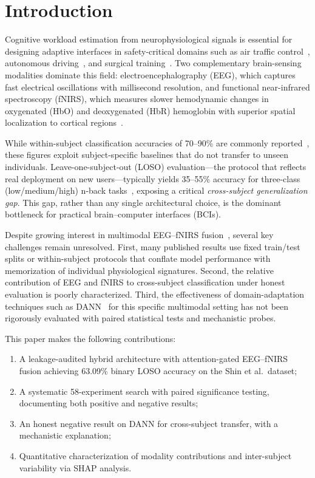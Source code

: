 \documentclass[conference]{IEEEtran}
\begin{document}
\section{Introduction}

Cognitive workload estimation from neurophysiological signals is essential for designing adaptive interfaces in safety-critical domains such as air traffic control~\cite{arico2016passive}, autonomous driving~\cite{dehais2020neuroergonomics}, and surgical training~\cite{guru2015surgical}. Two complementary brain-sensing modalities dominate this field: electroencephalography (EEG), which captures fast electrical oscillations with millisecond resolution, and functional near-infrared spectroscopy (fNIRS), which measures slower hemodynamic changes in oxygenated (HbO) and deoxygenated (HbR) hemoglobin with superior spatial localization to cortical regions~\cite{naseer2015fnirs}.

While within-subject classification accuracies of 70--90\% are commonly reported~\cite{shin2017open,aghajani2017measuring}, these figures exploit subject-specific baselines that do not transfer to unseen individuals. Leave-one-subject-out (LOSO) evaluation---the protocol that reflects real deployment on new users---typically yields 35--55\% accuracy for three-class (low/medium/high) n-back tasks~\cite{shin2018simultaneous,khan2020hybrid}, exposing a critical \emph{cross-subject generalization gap}. This gap, rather than any single architectural choice, is the dominant bottleneck for practical brain--computer interfaces (BCIs).

Despite growing interest in multimodal EEG--fNIRS fusion~\cite{hong2018hybrid,khan2014decoding,fazli2012enhanced}, several key challenges remain unresolved. First, many published results use fixed train/test splits or within-subject protocols that conflate model performance with memorization of individual physiological signatures. Second, the relative contribution of EEG and fNIRS to cross-subject classification under honest evaluation is poorly characterized. Third, the effectiveness of domain-adaptation techniques such as DANN~\cite{ganin2016domain} for this specific multimodal setting has not been rigorously evaluated with paired statistical tests and mechanistic probes.

This paper makes the following contributions:
\begin{enumerate}
    \item A leakage-audited hybrid architecture with attention-gated EEG--fNIRS fusion achieving 63.09\% binary LOSO accuracy on the Shin et al.\ dataset;
    \item A systematic 58-experiment search with paired significance testing, documenting both positive and negative results;
    \item An honest negative result on DANN for cross-subject transfer, with a mechanistic explanation;
    \item Quantitative characterization of modality contributions and inter-subject variability via SHAP analysis.
\end{enumerate}
\end{document}
